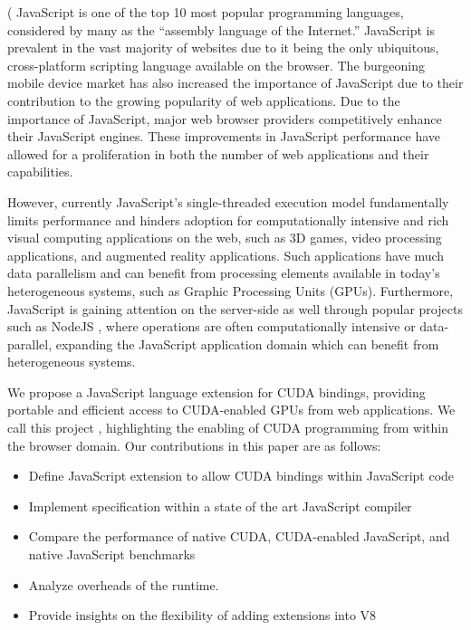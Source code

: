 (
JavaScript is one of the top 10 most popular programming languages, 
considered by many as the “assembly language of the Internet.” JavaScript is
prevalent in the vast majority of websites due to it being the only
ubiquitous, cross-platform scripting language available on the browser. The 
burgeoning mobile device market has also increased the importance of JavaScript due
to their contribution to the growing  popularity of web applications.
Due to the importance of JavaScript, major web browser providers competitively
enhance their JavaScript engines. These improvements in JavaScript performance
have allowed for a proliferation in both the number of web applications and
their capabilities.  

However, currently JavaScript's single-threaded execution model fundamentally limits
performance and hinders adoption for computationally intensive and rich visual
computing applications on the web, such as 3D games, video processing
applications, and augmented reality applications. Such applications have much data
parallelism and can benefit from processing elements available in today’s
heterogeneous systems, such as Graphic Processing Units (GPUs).  Furthermore,
JavaScript is gaining attention on the server-side as well through popular
projects such as NodeJS \cite{nodeJS}, where operations are often
computationally intensive or data-parallel, expanding the JavaScript application
domain which can benefit from heterogeneous systems.

We propose a JavaScript language extension for CUDA bindings, providing portable
and efficient access to CUDA-enabled GPUs from web applications.  We call this
project \namens, highlighting the enabling of CUDA programming from within the
browser domain. Our contributions in this paper are as follows:


\begin{itemize}

\item Define JavaScript extension to allow CUDA bindings within JavaScript code
\item Implement \name specification within a state of the art JavaScript compiler
\item Compare the performance of native CUDA, CUDA-enabled JavaScript, and native JavaScript benchmarks
\item Analyze overheads of the \name runtime.
\item Provide insights on the flexibility of adding extensions into V8

\end{itemize}

